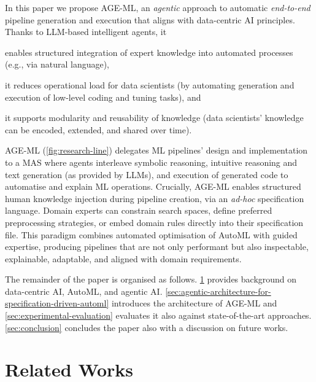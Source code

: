 \documentclass[runningheads]{llncs}
\newenvironment{inlinelist}{\begin{enumerate*}[label=\emph{(\roman*)}]}{\end{enumerate*}}
\newcommand{\ourapproach}[0]{\textsc{AGE-ML}}
\begin{document}
In this paper we propose \ourapproach{}, an \emph{agentic} approach to automatic \emph{end-to-end} pipeline generation and execution that aligns with data-centric \ac{AI} principles.
%
Thanks to \ac{LLM}-based intelligent agents, it
\begin{inlinelist}
    \item enables structured integration of expert knowledge into automated processes
    (e.g., via natural language),
    \item it reduces operational load for data scientists
    (by automating generation and execution of low-level coding and tuning tasks),
    and
    \item it supports modularity and reusability of knowledge
    (data scientists' knowledge can be encoded, extended, and shared over time).
\end{inlinelist}
\ourapproach{}
(\cref{fig:research-line})
delegates \ac{ML} pipelines' design and implementation to a \ac{MAS} where agents interleave
symbolic reasoning,
intuitive reasoning and text generation
(as provided by \acp{LLM}),
and execution of generated code
to automatise and explain \ac{ML} operations.
%
Crucially,
\ourapproach{} enables structured human knowledge injection during pipeline creation,
via an \emph{ad-hoc} specification language.
%
Domain experts can constrain search spaces,
define preferred preprocessing strategies,
or
embed domain rules directly into their specification file.
%
This paradigm combines automated optimisation of AutoML with guided expertise,
producing pipelines that are not only performant but also inspectable, explainable, adaptable,
and aligned with domain requirements.



The remainder of the paper is organised as follows.
\cref{sec:background-and-motivation} provides background on data-centric \ac{AI}, \ac{AutoML}, and agentic \ac{AI}.
\cref{sec:agentic-architecture-for-specification-driven-automl} introduces the architecture of \ourapproach{} and \cref{sec:experimental-evaluation} evaluates it also against state-of-the-art approaches.
\cref{sec:conclusion} concludes the paper also with a discussion on future works.

\section{Related Works}
\label{sec:background-and-motivation}
\end{document}
